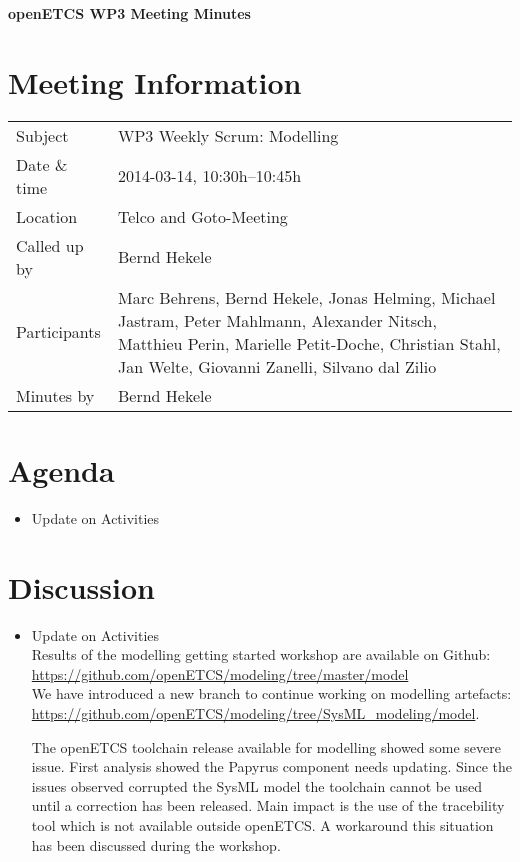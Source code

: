 \documentclass[a4paper, 11pt]{article}
\begin{document}
{\begin{center}\huge\bf openETCS WP3 Meeting Minutes\end{center}}
\section{Meeting Information}

\renewcommand{\arraystretch}{1.5}
\begin{supertabular}{m{.2\textwidth}m{.8\textwidth}}
Subject & WP3 Weekly Scrum: Modelling\\
Date \& time & 2014-03-14, 10:30h--10:45h\\
Location & Telco and Goto-Meeting\\
Called up by & Bernd Hekele\\
Participants &
Marc Behrens,
Bernd Hekele,
Jonas Helming,
Michael Jastram,
Peter Mahlmann,
Alexander Nitsch,
Matthieu Perin,
Marielle Petit-Doche,
Christian Stahl,
Jan Welte,
Giovanni Zanelli,
Silvano dal Zilio
\\

Minutes by & Bernd Hekele\\
\end{supertabular}
\renewcommand{\arraystretch}{1.0}


\section{{Agenda}}
\begin{itemize}
\item Update on Activities
\end{itemize}

\section{Discussion}
\begin{itemize}
\item Update on Activities\\
Results of the modelling getting started workshop are available on Github: \url{https://github.com/openETCS/modeling/tree/master/model}\\

We have introduced a new branch to continue working on modelling artefacts: \url{https://github.com/openETCS/modeling/tree/SysML_modeling/model}.

The openETCS toolchain release available for modelling showed some severe issue. First analysis showed the Papyrus component needs updating. Since the issues observed corrupted the SysML model the toolchain cannot be used until a correction has been released.  Main impact is the use of the tracebility tool which is not available outside openETCS. A workaround this situation has been discussed during the workshop.

\end{itemize}
\end{document}

